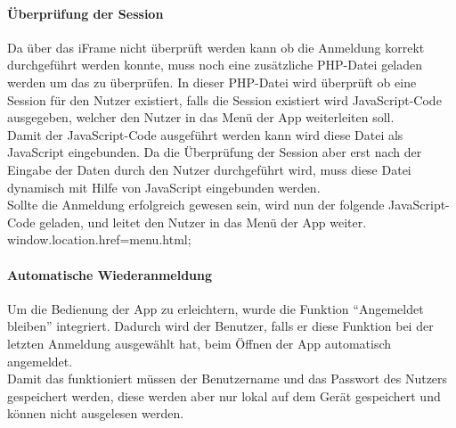 \paragraph{Überprüfung der Session\\}
	
Da über das iFrame nicht überprüft werden kann ob die Anmeldung korrekt durchgeführt werden konnte, muss noch eine zusätzliche PHP-Datei geladen werden um das zu überprüfen. In dieser PHP-Datei wird überprüft ob eine Session für den Nutzer existiert, falls die Session existiert wird JavaScript-Code ausgegeben, welcher den Nutzer in das Menü der App weiterleiten soll.\\



Damit der JavaScript-Code ausgeführt werden kann wird diese Datei als JavaScript eingebunden. Da die Überprüfung der Session aber erst nach der Eingabe der Daten durch den Nutzer durchgeführt wird, muss diese Datei dynamisch mit Hilfe von JavaScript eingebunden werden.\\



Sollte die Anmeldung erfolgreich gewesen sein, wird nun der folgende JavaScript-Code geladen, und leitet den Nutzer in das Menü der App weiter.\\

window.location.href=\grq menu.html\grq;

\paragraph{Automatische Wiederanmeldung\\}
	
Um die Bedienung der App zu erleichtern, wurde die Funktion \enquote{Angemeldet bleiben} integriert. Dadurch wird der Benutzer, falls er diese Funktion bei der letzten Anmeldung ausgewählt hat, beim Öffnen der App automatisch angemeldet.\\

Damit das funktioniert müssen der Benutzername und das Passwort des Nutzers gespeichert werden, diese werden aber nur lokal auf dem Gerät gespeichert und können nicht ausgelesen werden.\\

